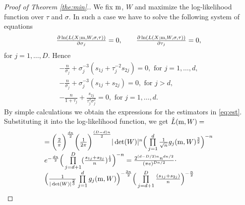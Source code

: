 \begin{proof}[Proof of Theorem \ref{the:min}.]
We fix  $\mathrm{m}$, $W$ and maximize the log-likelihood function over $\tau$ and $\sigma$.
In such a case we have to solve the following system of equations
$$
\begin{array}{l}
\frac{\partial  \ln ( L(X;\m,W,\sigma,\tau) ) }{\partial \sigma_j} =0, \qquad %
 \frac{\partial  \ln ( L(X;\m,W,\sigma,\tau) ) }{\partial \tau_j} =0 , %
\end{array}
$$
for  $ j=1,\ldots,D$. Hence
$$
\begin{array}{l}
-\frac{n}{\sigma_j} +  \sigma_j^{-3} (s_{1j} + \tau_j^{-2} s_{2j} ) = 0, \mbox{ for }  j=1,\ldots,d,\\[6pt]
 -\frac{n}{\sigma_j} +  \sigma_j^{-3} (s_{1j} + s_{2j} ) =0, \mbox{ for } j>d, \\[6pt] %
- \frac{n}{1+\tau_j} + \frac{s_{2j}}{\tau_j^{3}\sigma_j^{2}} =0 , \mbox{ for } j=1,\ldots,d.
\end{array}
$$
By simple calculations we obtain the expressions for the estimators in \ref{eq:est}.
Substituting it into the log-likelihood function,
we get $\hat{L}(\mathrm{m},W) =$
$$
\begin{array}{l}
= \bigg( \frac{2}{\pi} \bigg)^{\frac{dn}{2}}  \bigg( \frac{1}{2\pi} \bigg)^{\frac{(D-d)n}{2}} |\det(W)|^{n} \Big( \prod\limits_{j=1}^{d} \frac{1}{\sqrt{n}} g_j(\mathrm{m},W)^{\frac{3}{2}} \Big)^{-n} \\[6pt]
e^{-\frac{dn}{2}} \Big( \prod\limits_{j=d+1}^{D} (\frac{s_{1j} + s_{2j}}{n})^{\frac{1}{2}} \Big)^{-n} = \frac{ 2^{(d-D/2)n} n^{dn/2} }{(\pi e)^{Dn/2}} \cdot \\[6pt]
\Big( \frac{1}{|\det(W)|^{\frac{2}{3}}} \prod\limits_{j=1}^{d} g_j(\mathrm{m},W) \Big)^{-\frac{3n}{2}} \Big( \prod\limits_{j=d+1}^{D} \frac{(s_{1j} + s_{2j})}{n} \Big)^{-\frac{n}{2}} 
\end{array}
$$
\end{proof}
